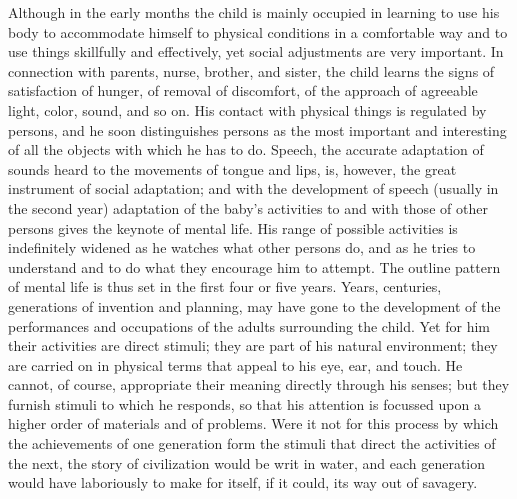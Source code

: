 \documentclass[showtrims,ustradepaper]{memoir}
\begin{document}

Although in the early months the child is mainly
occupied
in learning to use his body to accommodate himself to physical
conditions in a comfortable way and to use things skillfully and
effectively, yet social adjustments are very important. In connection
with parents, nurse, brother, and sister, the child learns the signs of
satisfaction of hunger, of removal of discomfort, of the approach of
agreeable light, color, sound, and so on. His contact with physical
things is regulated by persons, and he soon distinguishes persons as the
most important and interesting of all the objects with which he has to
do. Speech, the accurate adaptation of sounds heard to the movements of
tongue and lips, is, however, the great instrument of social adaptation;
and with the development of speech (usually in the second year)
adaptation of the baby's activities to and with those of other persons
gives the keynote of mental life. His range of possible activities is
indefinitely widened as he watches what other persons do, and as he
tries to understand and to do what they encourage him to attempt. The
outline pattern of mental life is thus set in the first four or five
years. Years, centuries, generations of invention and planning, may have
gone to the development of the performances and occupations of the
adults surrounding the child. Yet for him their activities are direct
stimuli; they are part of his natural environment; they are carried on
in physical terms that appeal to his eye, ear, and touch. He cannot, of
course, appropriate their meaning directly through his senses; but they
furnish stimuli to which he responds, so that his attention is focussed
upon a higher order of materials and of problems. Were it not for this
process by which the achievements of one generation form the stimuli
that direct the activities of the next, the story of
civilization
would be writ in water, and each generation would have laboriously to
make for itself, if it could, its way out of savagery.

\end{document}

